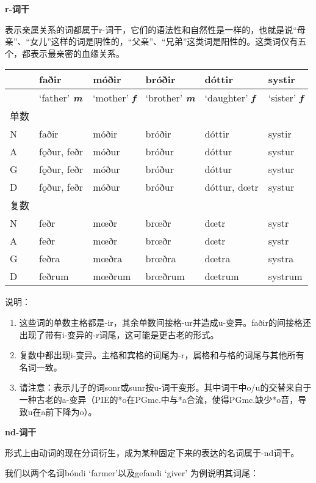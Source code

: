 \textbf{r-词干}

表示亲属关系的词都属于r-词干，它们的语法性和自然性是一样的，也就是说``母亲''、``女儿''这样的词是阴性的，``父亲''、``兄弟''这类词是阳性的。这类词仅有五个，都表示最亲密的血缘关系。

\begin{longtable}{llllll}
\toprule
 & faðir & móðir & bróðir & dóttir & systir \\
\midrule
\endhead
\bottomrule
\endfoot
& `father' \emph{\textbf{m}} & `mother' \emph{\textbf{f}} & `brother'
\emph{\textbf{m}} & `daughter' \emph{\textbf{f}} & `sister'
\emph{\textbf{f}} \\
单数 & & & & & \\
N & faðir & móðir & bróðir & dóttir & systir \\
A & fǫður, feðr & móður & bróður & dóttur & systur \\
G & fǫður, feðr & móður & bróður & dóttur & systur \\
D & fǫður, feðr & móður & bróður & dóttur, dœtr & systur \\
复数 & & & & & \\
N & feðr & mœðr & brœðr & dœtr & systr \\
A & feðr & mœðr & brœðr & dœtr & systr \\
G & feðra & mœðra & brœðra & dœtra & systra \\
D & feðrum & mœðrum & brœðrum & dœtrum & systrum \\
\end{longtable}

说明：

\begin{enumerate}
\def\labelenumi{\arabic{enumi})}
\item
  这些词的单数主格都是-ir，其余单数间接格-ur并造成u-变异。faðir的间接格还出现了带有i-变异的-r词尾，这可能是更古老的形式。
\item
  复数中都出现i-变异。主格和宾格的词尾为-r，属格和与格的词尾与其他所有名词一致。
\item
  请注意：表示儿子的词sonr或sunr按u-词干变形。其中词干中o/u的交替来自于一种古老的a-变异（PIE的*o在PGmc.中与*a合流，使得PGmc.缺少*o音，导致u在a前下降为o）。
\end{enumerate}

\textbf{nd-词干}

形式上由动词的现在分词衍生，成为某种固定下来的表达的名词属于-nd词干。

我们以两个名词bóndi `farmer'以及gefandi `giver' 为例说明其词尾：

